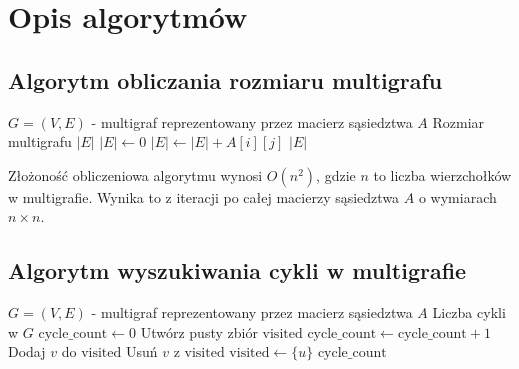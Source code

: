 \section{Opis algorytmów}

\subsection{Algorytm obliczania rozmiaru multigrafu}
\begin{algorithm}[H]
\caption{Obliczanie rozmiaru multigrafu}
\begin{algorithmic}[1]
\Require \( G = (V, E) \) - multigraf reprezentowany przez macierz sąsiedztwa \( A \)
\Ensure Rozmiar multigrafu \( |E| \)
\State \( |E| \gets 0 \)
    \State \( |E| \gets |E| + A[i][j] \)
\EndFor
\State \Return \( |E| \)
\end{algorithmic}
\end{algorithm}

Złożoność obliczeniowa algorytmu wynosi \( O(n^2) \), gdzie \( n \) to liczba wierzchołków w multigrafie. Wynika to z iteracji po całej macierzy sąsiedztwa \( A \) o wymiarach \( n \times n \).

\subsection{Algorytm wyszukiwania cykli w multigrafie}
\begin{algorithm}[H]
\caption{Znajdowanie cykli w multigrafie}\label{alg:find_cycles}
\begin{algorithmic}[1]
\Require \( G = (V, E) \) - multigraf reprezentowany przez macierz sąsiedztwa \( A \)
\Ensure Liczba cykli w \( G \)
\State \( \text{cycle\_count} \gets 0 \)
\State Utwórz pusty zbiór \( \text{visited} \)
        \State \( \text{cycle\_count} \gets \text{cycle\_count} + 1 \)
        \State \Return
    \EndIf
            \State Dodaj \( v \) do \( \text{visited} \)
            \State {}
            \State Usuń \( v \) z \( \text{visited} \)
        \EndIf
    \EndFor
\EndFunction
{}
    \State \( \text{visited} \gets \{u\} \)
    \State {}
\EndFor
\State \Return \( \text{cycle\_count} \)
\end{algorithmic}
\end{algorithm}


